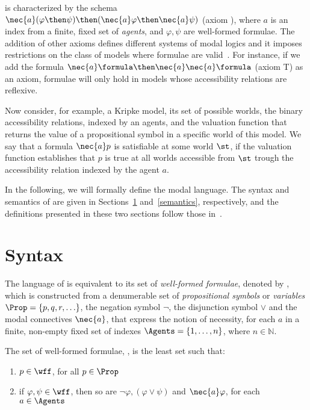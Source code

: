  is characterized by the schema
$\nec{a}(\varphi \then \psi) \then (\nec{a} \varphi \then \nec{a} \psi)$ (axiom
), where $a$ is an index from a finite, fixed set of
\emph{agents}, and $\varphi, \psi$ are well-formed formulae. The addition of
other axioms defines different systems of modal logics and it imposes
restrictions on the class of models where formulae are
valid~\cite{chellas:modal_logic}. For instance, if we add the formula $\nec{a}
\formula \then \nec{a} \nec{a} \formula$ (axiom {T}) as an axiom, formulae will
only hold in models whose accessibility relations are reflexive.

Now consider, for example, a Kripke model, its set of possible worlds, the
binary accessibility relations, indexed by an agents, and the valuation function
that returns the value of a propositional symbol in a specific world of this
model. We say that a formula $\nec{a}p$ is satisfiable at some world $\st$, if
the valuation function establishes that $p$ is true at all worlds accessible
from $\st$ trough the accessibility relation indexed by the agent $a$.

In the following, we will formally define the modal language. The
syntax and semantics of  are given in Sections~\ref{syntax}
and~\ref{semantics}, respectively, and the definitions presented in these two
sections follow those in~\cite{journals/jal/NalonD07}.

\section{Syntax}%
\label{syntax}

The language of  is equivalent to its set of \emph{well-formed
formulae}, denoted by \wff, which is constructed from a denumerable set of
\emph{propositional symbols} or \emph{variables} $\Prop = \{p, q, r, \ldots\}$,
the negation symbol $\neg$, the disjunction symbol $\lor$ and the modal
connectives $\nec{a}$, that express the notion of necessity, for each $a$ in a
finite, non-empty fixed set of indexes $\Agents = \{1, \ldots, n\}$, where $n
\in \mathbb{N}$.

\begin{definition}%
\label{def:wff}
    The set of well-formed formulae, \wff, is the least set such that:
    \begin{enumerate}
        \item $p \in \wff$, for all $p \in \Prop$
            \vspace{.2ex}
        \item if $\varphi, \psi \in \wff$, then so are $\neg \varphi, (\varphi
            \lor \psi)$ and $\nec{a} \varphi$, for each $a \in \Agents$
    \end{enumerate}
\end{definition}

